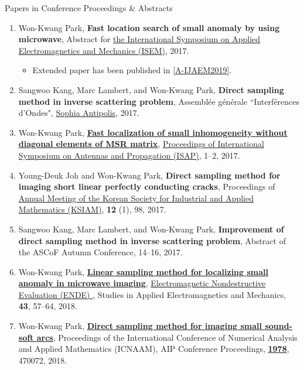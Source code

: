 \documentclass{resume} %
\begin{document}
\begin{rSection}{Papers in Conference Proceedings \& Abstracts}
\begin{enumerate}
\item\label{C-ISEM2017} Won-Kwang Park, \textbf{Fast location search of small anomaly by using microwave}, Abstract for \href{http://www.isem2017.org/}{the  International Symposium on Applied Electromagnetics and Mechanics (ISEM)}, 2017.
\begin{itemize}
\item Extended paper has been published in \ref{A-IJAEM2019}.
\end{itemize}
\item\label{C-GDRONDES2017}Sangwoo Kang, Marc Lambert, and Won-Kwang Park, \textbf{Direct sampling method in inverse scattering problem}, Assembl{\'e}e g{\'e}n{\'e}rale ``Interf{\'e}rences d'Ondes", \href{https://www.sophia-antipolis.fr}{Sophia Antipolis}, 2017.
\item\label{C-ISAP2017} Won-Kwang Park, \href{https://doi.org/10.1109/ISANP.2017.8228715}{\textbf{Fast localization of small inhomogeneity without diagonal elements of MSR matrix}}, \href{http://ieeexplore.ieee.org/xpl/mostRecentIssue.jsp?punumber=8170167}{Proceedings of International Symposium on Antennas and Propagation (ISAP)}, 1--2, 2017.
\item\label{C-KSIAM2017}Young-Deuk Joh and Won-Kwang Park, \textbf{Direct sampling method for imaging short linear perfectly conducting cracks}, Proceedings of \href{http://ksiam.org/conference/201711/welcome.php}{Annual Meeting of the Korean Society for Industrial and Applied Mathematics (KSIAM)}, \textbf{12} (1), 98, 2017.
\item\label{C-ASCOF2017}Sangwoo Kang, Marc Lambert, and Won-Kwang Park, \textbf{Improvement of direct sampling method in inverse scattering problem}, Abstract of the ASCoF Autumn Conference, 14--16, 2017.
\item\label{C-ENDE2017} Won-Kwang Park, \href{http://dx.doi.org/10.3233/978-1-61499-836-5-57}{\textbf{Linear sampling method for localizing small anomaly in microwave imaging}}, \href{http://ebooks.iospress.nl/volume/electromagnetic-non-destructive-evaluation-xxi}{Electromagnetic Nondestructive Evaluation (ENDE) }, Studies in Applied Electromagnetics and Mechanics, \textbf{43}, 57--64, 2018.
\item\label{C-ICNAAM2018} Won-Kwang Park, \href{https://doi.org/10.1063/1.5044142}{\textbf{Direct sampling method for imaging small sound-soft arcs}}, Proceedings of the  International Conference of Numerical Analysis and Applied Mathematics (ICNAAM), AIP Conference Proceedings, \href{https://aip.scitation.org/toc/apc/1978/1}{\textbf{1978}}, 470072, 2018.

\end{enumerate}
\end{rSection}
\end{document}
